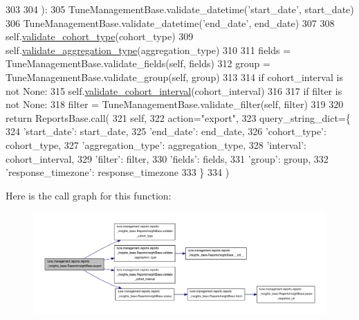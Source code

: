 \begin{DoxyCode}
303 
304     ):
305         TuneManagementBase.validate\_datetime(\textcolor{stringliteral}{'start\_date'}, start\_date)
306         TuneManagementBase.validate\_datetime(\textcolor{stringliteral}{'end\_date'}, end\_date)
307 
308         self.\hyperlink{classtune_1_1management_1_1reports_1_1reports__insights__base_1_1ReportsInsightBase_a78f6a5bfe7258d65e381281510ae9909}{validate\_cohort\_type}(cohort\_type)
309         self.\hyperlink{classtune_1_1management_1_1reports_1_1reports__insights__base_1_1ReportsInsightBase_a21b9eb499a7eb17b2a9bb887d4490688}{validate\_aggregation\_type}(aggregation\_type)
310 
311         fields = TuneManagementBase.validate\_fields(self, fields)
312         group = TuneManagementBase.validate\_group(self, group)
313         
314         \textcolor{keywordflow}{if} cohort\_interval \textcolor{keywordflow}{is} \textcolor{keywordflow}{not} \textcolor{keywordtype}{None}:
315             self.\hyperlink{classtune_1_1management_1_1reports_1_1reports__insights__base_1_1ReportsInsightBase_ad46443a32fbdae1590e4dfbeb945c566}{validate\_cohort\_interval}(cohort\_interval)
316 
317         \textcolor{keywordflow}{if} filter \textcolor{keywordflow}{is} \textcolor{keywordflow}{not} \textcolor{keywordtype}{None}:
318             filter = TuneManagementBase.validate\_filter(self, filter)
319 
320         \textcolor{keywordflow}{return} ReportsBase.call(
321             self,
322             action=\textcolor{stringliteral}{"export"},
323             query\_string\_dict=\{
324                 \textcolor{stringliteral}{'start\_date'}: start\_date,
325                 \textcolor{stringliteral}{'end\_date'}: end\_date,
326                 \textcolor{stringliteral}{'cohort\_type'}: cohort\_type,
327                 \textcolor{stringliteral}{'aggregation\_type'}: aggregation\_type,
328                 \textcolor{stringliteral}{'interval'}: cohort\_interval,
329                 \textcolor{stringliteral}{'filter'}: filter,
330                 \textcolor{stringliteral}{'fields'}: fields,
331                 \textcolor{stringliteral}{'group'}: group,
332                 \textcolor{stringliteral}{'response\_timezone'}: response\_timezone
333             \}
334         )

\end{DoxyCode}


Here is the call graph for this function\-:
\nopagebreak
\begin{figure}[H]
\begin{center}
\leavevmode
\includegraphics[width=350pt]{classtune_1_1management_1_1reports_1_1reports__insights__base_1_1ReportsInsightBase_a8bee2fdfa90cf8a89064e23207c6441f_cgraph}
\end{center}
\end{figure}




